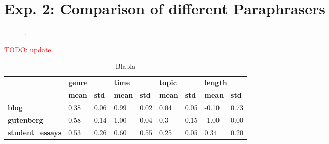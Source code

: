 \section{Exp. 2: Comparison of different Paraphrasers}

\begin{figure}[htbp]
    \centering
    
    \caption{.}
    \label{fig:extraction_eval}
\end{figure}

\textcolor{red}{TODO: update}
\begin{table}[]
\centering
\caption{Blabla}
\label{tab:extraction_eval_stats}
\begin{tabular}{lllllllll}
\toprule
 &
  \multicolumn{2}{l}{\textbf{genre}} &
  \multicolumn{2}{l}{\textbf{time}} &
  \multicolumn{2}{l}{\textbf{topic}} &
  \multicolumn{2}{l}{\textbf{length}} \\
 &
  \textbf{mean} &
  \textbf{std} &
  \textbf{mean} &
  \textbf{std} &
  \textbf{mean} &
  \textbf{std} &
  \textbf{mean} &
  \textbf{std} \\
  \midrule
\textbf{blog}            & 0.38 & 0.06  & 0.99 & 0.02 & 0.04  & 0.05  & -0.10 & 0.73 \\
\textbf{gutenberg}       & 0.58 & 0.14  & 1.00 & 0.04 & 0.3 & 0.15 & -1.00 & 0.00  \\
\textbf{student\_essays} & 0.53 & 0.26 & 0.60 & 0.55 & 0.25 & 0.05  & 0.34 & 0.20 \\
  \bottomrule
\end{tabular}%
\end{table}